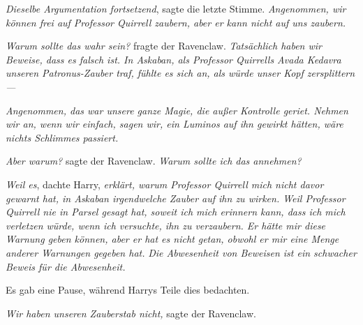 \emph{Dieselbe Argumentation fortsetzend}, sagte die letzte Stimme. \emph{Angenommen, wir können frei auf Professor Quirrell zaubern, aber er kann nicht auf uns zaubern.}

\emph{Warum sollte das wahr sein?} fragte der Ravenclaw. \emph{Tatsächlich haben wir Beweise, dass es falsch ist. In Askaban, als Professor Quirrells Avada Kedavra unseren Patronus-Zauber traf, fühlte es sich an, als würde unser Kopf zersplittern—}

\emph{Angenommen, das war unsere ganze Magie, die außer Kontrolle geriet. Nehmen wir an, wenn wir einfach, sagen wir, ein Luminos auf ihn gewirkt hätten, wäre nichts Schlimmes passiert.}

\emph{Aber warum?} sagte der Ravenclaw. \emph{Warum sollte ich das annehmen?}

\emph{Weil es}, dachte Harry, \emph{erklärt, warum Professor Quirrell mich nicht davor gewarnt hat, in Askaban irgendwelche Zauber auf ihn zu wirken. Weil Professor Quirrell nie in Parsel gesagt hat, soweit ich mich erinnern kann, dass ich mich verletzen würde, wenn ich versuchte, ihn zu verzaubern. Er hätte mir diese Warnung geben können, aber er hat es nicht getan, obwohl er mir eine Menge anderer Warnungen gegeben hat.} \emph{Die Abwesenheit von Beweisen ist ein schwacher Beweis für die Abwesenheit.}

Es gab eine Pause, während Harrys Teile dies bedachten.

\emph{Wir haben unseren Zauberstab nicht,} sagte der Ravenclaw.

